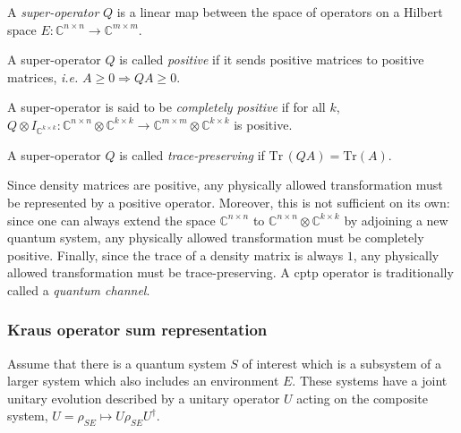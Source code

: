 
\begin{definition}
  A \emph{super-operator} $Q$ is a linear map between the space of operators on a Hilbert space $E: \mathbb{C}^{n\times n} \rightarrow  \mathbb{C}^{m\times m}$. 
\end{definition}

\begin{definition}
  A super-operator $Q$ is called \emph{positive} if it sends positive matrices to positive matrices, \textit{i.e.} $A \geq 0 \Rightarrow{} Q A \geq 0$.
\end{definition}

\begin{definition}
  A super-operator is said to be \emph{completely positive} if for all $k$, $Q \otimes I_{\mathbb{C}^{k \times k}}: \mathbb{C}^{n \times n} \otimes \mathbb{C}^{k \times k} \rightarrow \mathbb{C}^{m \times m} \otimes \mathbb{C}^{k \times k}  $ is positive.
\end{definition}

\begin{definition}
  A super-operator $Q$ is called \emph{trace-preserving} if $\text{Tr} \hspace{2pt} (Q A)= \text{Tr} (A)$.
\end{definition}

Since density matrices are positive, any physically allowed transformation must be represented by a positive operator. Moreover, this is not sufficient on its own: since one can always extend the space $\mathbb{C}^{n \times n}$ to  $\mathbb{C}^{n \times n} \otimes \mathbb{C}^{k \times k} $ by adjoining a new quantum system, any physically allowed transformation must be completely positive. Finally, since the trace of a density matrix is always $1$, any physically allowed transformation must be trace-preserving. A \acrfull{cptp} operator is traditionally called a \emph{quantum channel}.

\subsubsection{Kraus operator sum representation}
Assume that there is a quantum system $S$ of interest which is a subsystem of a larger system which also includes an environment $E$. These systems have a joint unitary evolution described by a unitary operator $U$ acting on the composite system, $U = \rho_{SE} \mapsto U \rho_{SE} U^{\dag}$. 

